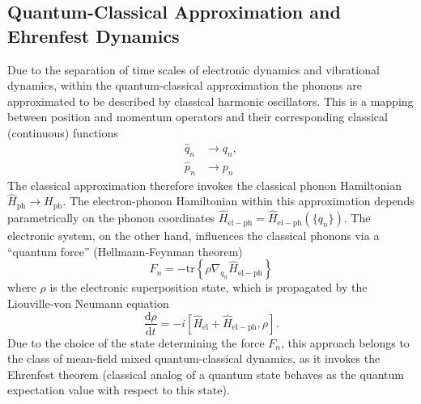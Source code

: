 \documentclass{article}
\newcommand{\tr}[1]{\mathrm{tr}\left\{#1\right\}}
\begin{document}
\subsection{Quantum-Classical Approximation and Ehrenfest Dynamics}
Due to the separation of time scales of electronic dynamics and vibrational dynamics, within the quantum-classical approximation the phonons are approximated to be described by classical harmonic oscillators. This is a mapping between position and momentum operators and their corresponding classical (continuous) functions
\begin{align}
	\hat{q}_n& \rightarrow q_n,\\
	\hat{p}_n &\rightarrow p_n
\end{align}
The classical approximation therefore invokes the classical phonon Hamiltonian  $\hat{H}_\mathrm{ph}\rightarrow H_\mathrm{ph}$. The electron-phonon Hamiltonian within this approximation depends parametrically on the phonon coordinates $\hat{H}_\mathrm{el-ph} = \hat{H}_\mathrm{el-ph}(\{q_n\})$. The electronic system, on the other hand, influences the classical phonons via a ``quantum force'' (Hellmann-Feynman theorem) \cite{krotz2021reciprocal}
\begin{equation}
	F_n = -\tr{\rho \nabla_{q_n} \hat{H}_\mathrm{el-ph}}
\end{equation}
where $\rho$ is the electronic superposition state, which is propagated by the Liouville-von Neumann equation
\begin{equation}
	\frac{\mathrm{d}\rho}{\mathrm{d}t} = -i[\hat{H}_\mathrm{el}+\hat{H}_\mathrm{el-ph},\rho].\label{eq:LVNEq}
\end{equation}
Due to the choice of the state determining the force $F_n$, this approach belongs to the class of mean-field mixed quantum-classical dynamics, as it invokes the Ehrenfest theorem (classical analog of a quantum state behaves as the quantum expectation value with respect to this state).
\end{document}
